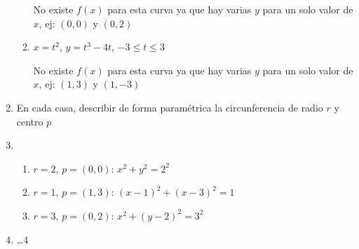\documentclass[../practica.root.tex]{subfiles}
\begin{document}
\begin{enumerate}
\begin{enumerate}
                    No existe $f(x)$ para esta curva ya que hay varias $y$ para un solo valor de $x$, ej: $(0,0)$ y $(0,2)$


              \item $x = t^2$, $y = t^3 - 4t$, $-3 \leq t \leq 3$

                    No existe $f(x)$ para esta curva ya que hay varias $y$ para un solo valor de $x$, ej: $(1,3)$ y $(1,-3)$

          \end{enumerate}
    \item En cada casa, describir de forma paramétrica la circunferencia de radio $r$ y centro $p$
    \item \begin{enumerate}
              \item $r = 2$, $p = (0, 0)$: $x^2 + y^2 = 2^2$
              \item $r = 1$, $p = (1, 3)$: $(x - 1)^2 + (x - 3)^2 = 1$
              \item $r = 3$, $p = (0, 2)$: $x^2 + (y - 2)^2 = 3^2$
          \end{enumerate}
    \item \dots 4
\end{enumerate}
\end{document}
